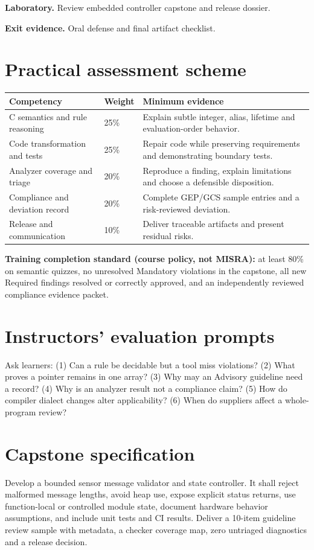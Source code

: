 \documentclass[10pt,letterpaper]{article}
\begin{document}
\textbf{Laboratory.} Review embedded controller capstone and release dossier.

\textbf{Exit evidence.} Oral defense and final artifact checklist.


\section{Practical assessment scheme}
\begin{tabularx}{\linewidth}{@{}p{.31\linewidth}p{.14\linewidth}X@{}}\toprule
Competency & Weight & Minimum evidence\\\midrule
C semantics and rule reasoning & 25\% & Explain subtle integer, alias, lifetime and evaluation-order behavior.\\
Code transformation and tests & 25\% & Repair code while preserving requirements and demonstrating boundary tests.\\
Analyzer coverage and triage & 20\% & Reproduce a finding, explain limitations and choose a defensible disposition.\\
Compliance and deviation record & 20\% & Complete GEP/GCS sample entries and a risk-reviewed deviation.\\
Release and communication & 10\% & Deliver traceable artifacts and present residual risks.\\\bottomrule\end{tabularx}
\begin{keybox}\textbf{Training completion standard (course policy, not MISRA):} at least 80\% on semantic quizzes, no unresolved Mandatory violations in the capstone, all new Required findings resolved or correctly approved, and an independently reviewed compliance evidence packet.\end{keybox}
\section{Instructors' evaluation prompts}
Ask learners: (1) Can a rule be decidable but a tool miss violations? (2) What proves a pointer remains in one array? (3) Why may an Advisory guideline need a record? (4) Why is an analyzer result not a compliance claim? (5) How do compiler dialect changes alter applicability? (6) When do suppliers affect a whole-program review?
\section{Capstone specification}
Develop a bounded sensor message validator and state controller. It shall reject malformed message lengths, avoid heap use, expose explicit status returns, use function-local or controlled module state, document hardware behavior assumptions, and include unit tests and CI results. Deliver a 10-item guideline review sample with metadata, a checker coverage map, zero untriaged diagnostics and a release decision.
\end{document}
